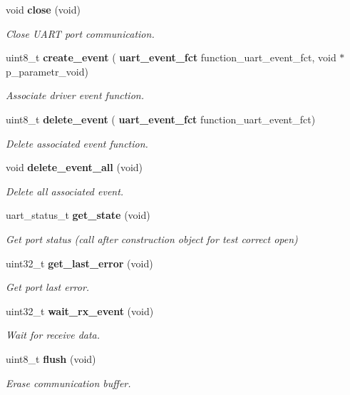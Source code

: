 \begin{DoxyCompactItemize}
void \textbf{ close} (void)
\begin{DoxyCompactList}\small\item\em Close U\+A\+RT port communication. \end{DoxyCompactList}\item 
uint8\+\_\+t \textbf{ create\+\_\+event} (\textbf{ uart\+\_\+event\+\_\+fct} function\+\_\+uart\+\_\+event\+\_\+fct, void $\ast$p\+\_\+parametr\+\_\+void)
\begin{DoxyCompactList}\small\item\em Associate driver event function. \end{DoxyCompactList}\item 
uint8\+\_\+t \textbf{ delete\+\_\+event} (\textbf{ uart\+\_\+event\+\_\+fct} function\+\_\+uart\+\_\+event\+\_\+fct)
\begin{DoxyCompactList}\small\item\em Delete associated event function. \end{DoxyCompactList}\item 
void \textbf{ delete\+\_\+event\+\_\+all} (void)
\begin{DoxyCompactList}\small\item\em Delete all associated event. \end{DoxyCompactList}\item 
uart\+\_\+status\+\_\+t \textbf{ get\+\_\+state} (void)
\begin{DoxyCompactList}\small\item\em Get port status (call after construction object for test correct open) \end{DoxyCompactList}\item 
uint32\+\_\+t \textbf{ get\+\_\+last\+\_\+error} (void)
\begin{DoxyCompactList}\small\item\em Get port last error. \end{DoxyCompactList}\item 
uint32\+\_\+t \textbf{ wait\+\_\+rx\+\_\+event} (void)
\begin{DoxyCompactList}\small\item\em Wait for receive data. \end{DoxyCompactList}\item 
uint8\+\_\+t \textbf{ flush} (void)
\begin{DoxyCompactList}\small\item\em Erase communication buffer. \end{DoxyCompactList}\item 

\end{DoxyCompactItemize}

